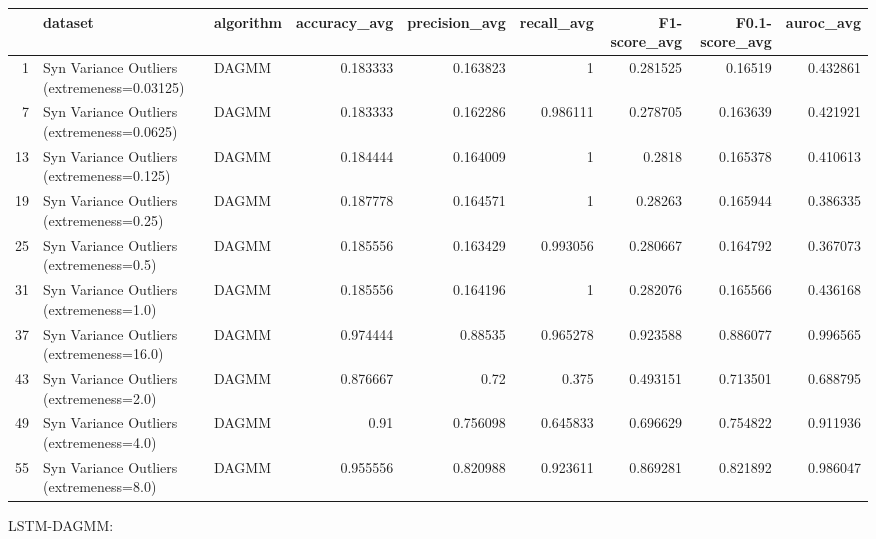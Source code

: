\begin{tabular}{rllrrrrrr}
\hline
    & dataset                                     & algorithm   &   accuracy\_avg &   precision\_avg &   recall\_avg &   F1-score\_avg &   F0.1-score\_avg &   auroc\_avg \\
\hline
  1 & Syn Variance Outliers (extremeness=0.03125) & DAGMM       &       0.183333 &        0.163823 &     1        &       0.281525 &         0.16519  &    0.432861 \\
  7 & Syn Variance Outliers (extremeness=0.0625)  & DAGMM       &       0.183333 &        0.162286 &     0.986111 &       0.278705 &         0.163639 &    0.421921 \\
 13 & Syn Variance Outliers (extremeness=0.125)   & DAGMM       &       0.184444 &        0.164009 &     1        &       0.2818   &         0.165378 &    0.410613 \\
 19 & Syn Variance Outliers (extremeness=0.25)    & DAGMM       &       0.187778 &        0.164571 &     1        &       0.28263  &         0.165944 &    0.386335 \\
 25 & Syn Variance Outliers (extremeness=0.5)     & DAGMM       &       0.185556 &        0.163429 &     0.993056 &       0.280667 &         0.164792 &    0.367073 \\
 31 & Syn Variance Outliers (extremeness=1.0)     & DAGMM       &       0.185556 &        0.164196 &     1        &       0.282076 &         0.165566 &    0.436168 \\
 37 & Syn Variance Outliers (extremeness=16.0)    & DAGMM       &       0.974444 &        0.88535  &     0.965278 &       0.923588 &         0.886077 &    0.996565 \\
 43 & Syn Variance Outliers (extremeness=2.0)     & DAGMM       &       0.876667 &        0.72     &     0.375    &       0.493151 &         0.713501 &    0.688795 \\
 49 & Syn Variance Outliers (extremeness=4.0)     & DAGMM       &       0.91     &        0.756098 &     0.645833 &       0.696629 &         0.754822 &    0.911936 \\
 55 & Syn Variance Outliers (extremeness=8.0)     & DAGMM       &       0.955556 &        0.820988 &     0.923611 &       0.869281 &         0.821892 &    0.986047 \\
\hline
\end{tabular}

LSTM-DAGMM:

